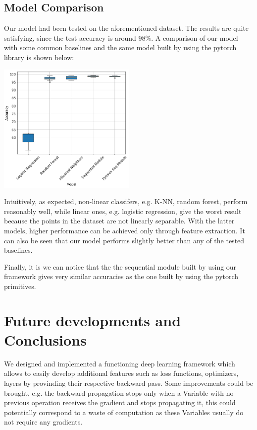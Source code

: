 \documentclass[10pt,conference,compsocconf]{IEEEtran}
\begin{document}
\subsection{Model Comparison}
Our model had been tested on the aforementioned dataset. The results are quite satisfying, since the test accuracy is around 98\%.
A comparison of our model with some common baselines and the same model built by using the pytorch library is shown below:
\begin{center}
	\captionsetup{type=figure}
	\includegraphics[width=0.5\textwidth]{img/boxplots_final.png}
	\label{fig:boxplot}
\end{center} 
Intuitively, as expected, non-linear classifers, e.g. K-NN, random forest, perform reasonably well, while linear ones, e.g. logistic regression, give the worst result because the points in the dataset are not linearly separable. With the latter models, higher performance can be achieved only through feature extraction. It can also be seen that our model performs slightly better than any of the tested baselines.

Finally, it is we can notice that the the sequential module built by using our framework gives very similar accuracies as the one built by using the pytorch primitives.

\section{Future developments and Conclusions}
\label{sec:Future}
We designed and implemented a functioning deep learning framework which allows to easily develop additional features such as loss functions, optimizers, layers by provinding their respective backward pass. Some improvements could be brought, e.g. the backward propagation stops only when a Variable with no previous operation receives the gradient and stops propagating it, this could potentially correspond to a waste of computation as these Variables usually do not require any gradients.
\end{document}
